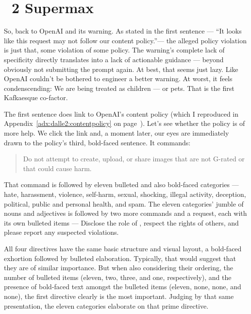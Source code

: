 
\section{\DALLE~2 Supermax}
\label{sec:dalle:supermax}

So, back to OpenAI and its warning. As stated in the first sentence --- ``It
looks like this request may not follow our content policy.''--- the alleged
policy violation is just that, some violation of some policy. The warning's
complete lack of specificity directly translates into a lack of actionable
guidance — beyond obviously not submitting the prompt again. At best, that seems
just lazy. Like OpenAI couldn't be bothered to engineer a better warning. At
worst, it feels condenscending: We are being treated as children --- or pets.
That is the first Kafkaesque co-factor.

The first sentence does link to OpenAI's content policy (which I reproduced in
Appendix~\ref{adx:dalle2:contentpolicy} on
page~\pageref{adx:dalle2:contentpolicy}). Let's see whether the policy is of
more help. We click the link and, a moment later, our eyes are immediately drawn
to the policy's third, bold-faced sentence. It commands:

\begin{quote}
Do not attempt to create, upload, or share images that are not G-rated or that
could cause harm.
\end{quote}

\noindent{}That command is followed by eleven bulleted and also bold-faced
categories — hate, harassment, violence, self-harm, sexual, shocking, illegal
activity, deception, political, public and personal health, and spam. The eleven
categories' jumble of nouns and adjectives is followed by two more commands and
a request, each with its own bulleted items — Disclose the role of \AI, respect
the rights of others, and please report any suspected violations.

All four directives have the same basic structure and visual layout, a
bold-faced exhortion followed by bulleted elaboration. Typically, that would
suggest that they are of similar importance. But when also considering their
ordering, the number of bulleted items (eleven, two, three, and one,
respectively), and the presence of bold-faced text amongst the bulleted items
(eleven, none, none, and none), the first directive clearly is the most
important. Judging by that same presentation, the eleven categories elaborate on
that prime directive.

